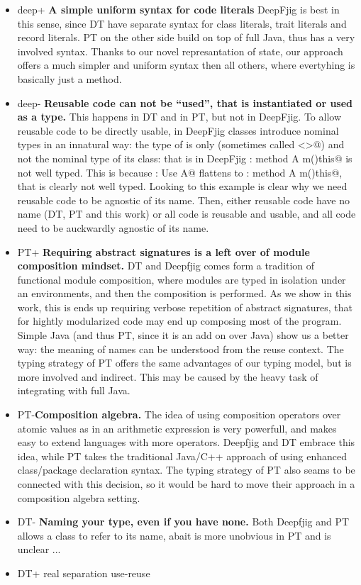 \begin{itemize}
\item deep+ {\bf A simple uniform syntax for code literals}
DeepFjig is best in this sense, since DT have separate syntax for class literals, trait literals and record literals.
PT on the other side build on top of full Java, thus has a very involved syntax.
Thanks to our novel represantation of state, our approach offers a much simpler and uniform syntax then
all others, where evertyhing is basically just a method.
\item deep-
{\bf Reusable code can not be ``used'', that is instantiated or used as a type.}
This happens in DT and in PT, but not in DeepFjig. To allow reusable code to be directly 
usable, in DeepFjig
classes introduce nominal types in an innatural way: the type of \Q@this@ is only \Q@This@ (sometimes called \Q@<>@) and not the nominal type of its class: that is in DeepFjig 
\Q@A:{ method A m()this}@ is not well typed. This is because
\Q@B: Use A@ flattens to \Q@B:{ method A m()this}@, that is clearly not well typed.
Looking to this example is clear why we need reusable code to be agnostic of its name.
Then, either reusable code have no name (DT, PT and this work)
or all code is reusable and usable, and all code need to be auckwardly agnostic of its name.

\item PT+
{\bf Requiring abstract signatures is a left over of module composition mindset.}
DT and Deepfjig comes form a tradition of functional module composition, where 
modules are typed in isolation under an environments, and then the composition is performed.
As we show in this work, this is ends up requiring verbose repetition of abstract signatures, 
that for hightly modularized code may end up composing most of the program.
Simple Java (and thus PT, since it is an add on over Java) show us a better way:
the meaning of names can be understood from the reuse context.
The typing strategy of PT offers the same advantages of our typing model, 
but is more involved and indirect. This may be caused by the
heavy task of integrating with full Java.
\item PT-{\bf Composition algebra.}
The idea of using composition operators over atomic values as in an arithmetic expression is very powerfull,
and makes easy to extend languages with more operators. Deepfjig and DT embrace this idea, while PT takes the traditional Java/C++ approach of using enhanced class/package declaration syntax.
The typing strategy of PT also seams to be connected with this decision, so it would be hard to move their approach in a composition algebra setting.
\item DT- {\bf Naming your type, even if you have none.}
Both Deepfjig and PT allows a class to refer to its name, abait is more unobvious in PT and is unclear 
...
\item DT+ real separation use-reuse

\end{itemize}

